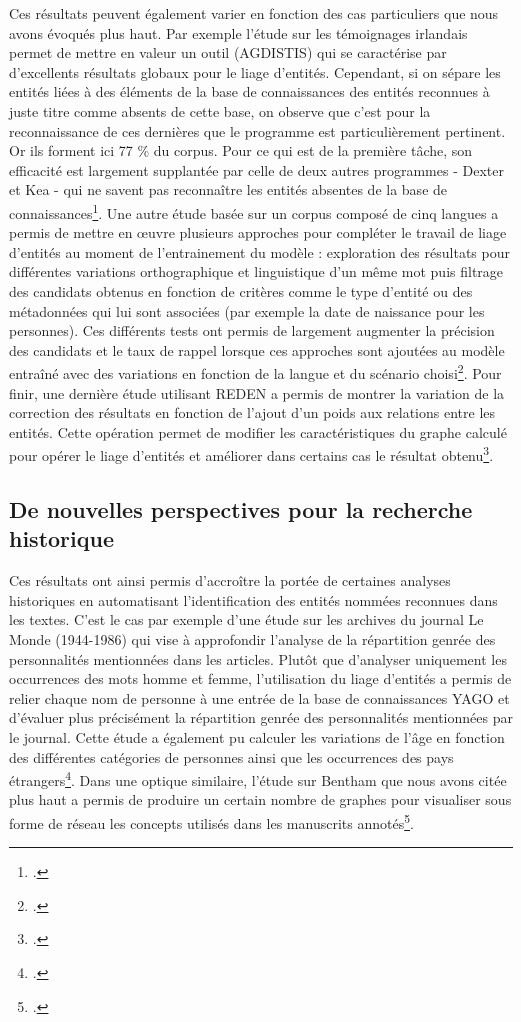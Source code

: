 \documentclass[a4paper,12pt,twoside]{book}
\begin{document}
	Ces résultats peuvent également varier en fonction des cas particuliers que nous avons évoqués plus haut. Par exemple l'étude sur les témoignages irlandais permet de mettre en valeur un outil (AGDISTIS) qui se caractérise par d'excellents résultats globaux pour le liage d'entités. Cependant, si on sépare les entités liées à des éléments de la base de connaissances des entités reconnues à juste titre comme absents de cette base, on observe que c'est pour la reconnaissance de ces dernières que le programme est particulièrement pertinent. Or ils forment ici 77 \% du corpus. Pour ce qui est de la première tâche, son efficacité est largement supplantée par celle de deux autres programmes - Dexter et Kea - qui ne savent pas reconnaître les entités absentes de la base de connaissances\footcite{munnelly_investigating_2018}. Une autre étude basée sur un corpus composé de cinq langues a permis de mettre en œuvre plusieurs approches pour compléter le travail de liage d'entités au moment de l'entrainement du modèle : exploration des résultats pour différentes variations orthographique et linguistique d'un même mot puis filtrage des candidats obtenus en fonction de critères comme le type d'entité ou des métadonnées qui lui sont associées (par exemple la date de naissance pour les personnes). Ces différents tests ont permis de largement augmenter la précision des candidats et le taux de rappel lorsque ces approches sont ajoutées au modèle entraîné avec des variations en fonction de la langue et du scénario choisi\footcite{linhares_pontes_entity_2020}. Pour finir, une dernière étude utilisant REDEN a permis de montrer la variation de la correction des résultats en fonction de l'ajout d'un poids aux relations entre les entités. Cette opération permet de modifier les caractéristiques du graphe calculé pour opérer le liage d'entités et améliorer dans certains cas le résultat obtenu\footcite{morzy_disambiguation_2015}.
	
	\subsection{De nouvelles perspectives pour la recherche historique}
	
	Ces résultats ont ainsi permis d'accroître la portée de certaines analyses historiques en automatisant l'identification des entités nommées reconnues dans les textes. C'est le cas par exemple d'une étude sur les archives du journal Le Monde (1944-1986) qui vise à approfondir l'analyse de la répartition genrée des personnalités mentionnées dans les articles. Plutôt que d'analyser uniquement les occurrences des mots \og homme\fg{} et \og femme\fg{}, l'utilisation du liage d'entités a permis de relier chaque nom de personne à une entrée de la base de connaissances YAGO et d'évaluer plus précisément la répartition genrée des personnalités mentionnées par le journal. Cette étude a également pu calculer les variations de l'âge en fonction des différentes catégories de personnes ainsi que les occurrences des pays étrangers\footcite{huet_mining_2013}. Dans une optique similaire, l'étude sur Bentham que nous avons citée plus haut a permis de produire un certain nombre de graphes pour visualiser sous forme de réseau les concepts utilisés dans les manuscrits annotés\footcite{ruiz_mapping_2019}. 
	
\end{document}
